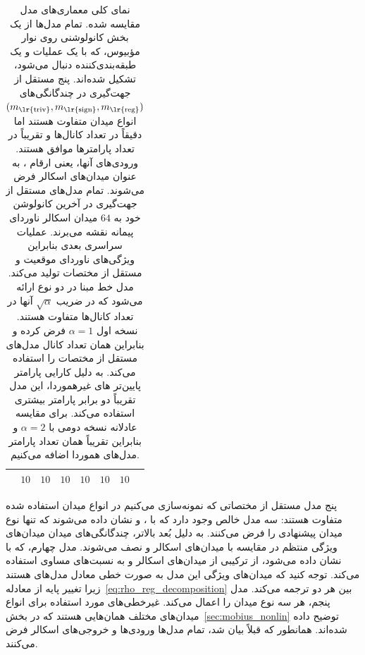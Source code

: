 \begin{table}
\begin{tabular}{lccccccc}
		& $10$          & $10$          & $10$          & $10$            & $10$           & $10$           \\
		\bottomrule
	\end{tabular}
	\vspace*{2.ex}
	\caption[]{\small
		نمای کلی معماری‌های مدل مقایسه شده.
		تمام مدل‌ها از یک بخش کانولوشنی روی نوار مؤبیوس، که با یک عملیات  و یک طبقه‌بندی‌کننده  دنبال می‌شود، تشکیل شده‌اند.
		پنج  مستقل از جهت‌گیری در چندگانگی‌های $(m_{\textup{\lr{triv}}},m_{\textup{\lr{sign}}},m_{\textup{\lr{reg}}})$ انواع میدان متفاوت هستند اما دقیقاً در تعداد کانال‌ها و تقریباً در تعداد پارامترها موافق هستند.
		ورودی‌های آنها، یعنی ارقام ، به عنوان میدان‌های اسکالر فرض می‌شوند.
		تمام مدل‌های مستقل از جهت‌گیری در آخرین کانولوشن خود به $64$ میدان اسکالر ناوردای پیمانه نقشه می‌برند.
		عملیات  سراسری بعدی بنابراین ویژگی‌های ناوردای موقعیت و مستقل از مختصات تولید می‌کند.
		مدل  خط مبنا در دو نوع ارائه می‌شود که در ضریب $\sqrt{\alpha}$ آنها در تعداد کانال‌ها متفاوت هستند.
		نسخه اول $\alpha=1$ فرض کرده و بنابراین همان تعداد کانال مدل‌های مستقل از مختصات را استفاده می‌کند.
		به دلیل کارایی پارامتر پایین‌تر های غیرهموردا، این مدل تقریباً دو برابر پارامتر بیشتری استفاده می‌کند.
		برای مقایسه عادلانه نسخه دومی با $\alpha=2$ و بنابراین تقریباً همان تعداد پارامتر مدل‌های هموردا اضافه می‌کنیم.
	}
	\label{tab:mobius_model_architectures}
\end{table}

پنج مدل مستقل از مختصاتی که نمونه‌سازی می‌کنیم در انواع میدان استفاده شده متفاوت هستند:
سه مدل خالص وجود دارد که با ،  و  نشان داده می‌شوند که تنها نوع میدان پیشنهادی را فرض می‌کنند.
به دلیل بُعد بالاتر، چندگانگی‌های میدان میدان‌های ویژگی منتظم در مقایسه با میدان‌های اسکالر و  نصف می‌شوند.
مدل چهارم، که با  نشان داده می‌شود، از ترکیبی از میدان‌های اسکالر و  به نسبت‌های مساوی استفاده می‌کند.
توجه کنید که میدان‌های ویژگی این مدل به صورت خطی معادل مدل‌های  هستند زیرا تغییر پایه از معادله~\eqref{eq:rho_reg_decomposition} بین هر دو ترجمه می‌کند.
مدل پنجم،  هر سه نوع میدان را اعمال می‌کند.
غیرخطی‌های مورد استفاده برای انواع میدان‌های مختلف همان‌هایی هستند که در بخش~\ref{sec:mobius_nonlin} توضیح داده شده‌اند.
همانطور که قبلاً بیان شد، تمام مدل‌ها ورودی‌ها و خروجی‌های اسکالر فرض می‌کنند.

